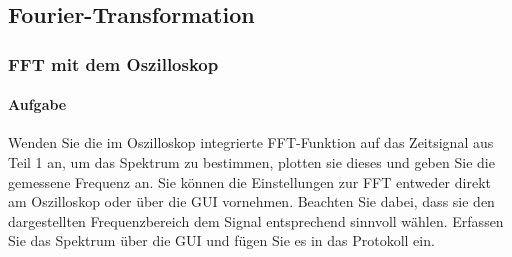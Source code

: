 \documentclass[10pt]{scrreprt}
\begin{document}
        \subsection{Fourier-Transformation}
        \subsubsection{FFT mit dem Oszilloskop}
        \paragraph{Aufgabe}
        Wenden Sie die im Oszilloskop integrierte FFT-Funktion auf das Zeitsignal aus
        Teil 1 an, um das Spektrum zu bestimmen, plotten sie dieses und geben Sie die
        gemessene Frequenz an. Sie können die Einstellungen zur FFT entweder direkt
        am Oszilloskop oder über die GUI vornehmen. Beachten Sie dabei, dass sie den
        dargestellten Frequenzbereich dem Signal entsprechend sinnvoll wählen. Erfassen
        Sie das Spektrum über die GUI und fügen Sie es in das Protokoll ein.
\end{document}
